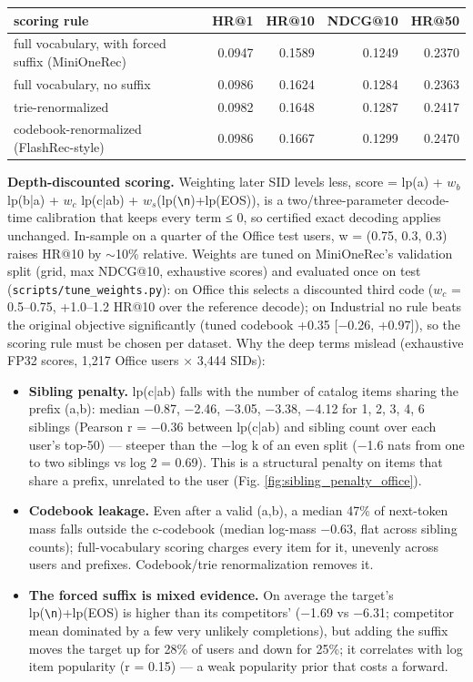 \documentclass[11pt]{article}
\newcommand{\nl}{\texttt{\textbackslash n}}
\newcommand{\code}[1]{\texttt{#1}}
\begin{document}
{\small
\setlength{\tabcolsep}{4pt}
\begin{longtable}{lrrrr}
\toprule
scoring rule & HR@1 & HR@10 & NDCG@10 & HR@50 \\
\midrule
\endhead
full vocabulary, with forced suffix (MiniOneRec) & 0.0947 & 0.1589 & 0.1249 & 0.2370 \\
full vocabulary, no suffix & 0.0986 & 0.1624 & 0.1284 & 0.2363 \\
trie-renormalized & 0.0982 & 0.1648 & 0.1287 & 0.2417 \\
codebook-renormalized (FlashRec-style) & 0.0986 & 0.1667 & 0.1299 & 0.2470 \\
\bottomrule
\end{longtable}
}

\textbf{Depth-discounted scoring.} Weighting later SID levels less, score = lp(a) + $w_{b}$ lp(b|a) + $w_{c}$ lp(c|ab) + $w_{s}$(lp(\nl{})+lp(EOS)), is a two/three-parameter decode-time calibration that keeps every term ≤ 0, so certified exact decoding applies unchanged. In-sample on a quarter of the Office test users, w = (0.75, 0.3, 0.3) raises HR@10 by \ensuremath{\sim}10\% relative. Weights are tuned on MiniOneRec's validation split (grid, max NDCG@10, exhaustive scores) and evaluated once on test (\code{scripts/\allowbreak{}tune\_\allowbreak{}weights.py}): on Office this selects a discounted third code ($w_{c}$ = 0.5–0.75, +1.0–1.2 HR@10 over the reference decode); on Industrial no rule beats the original objective significantly (tuned codebook +0.35 [−0.26, +0.97]), so the scoring rule must be chosen per dataset. Why the deep terms mislead (exhaustive FP32 scores, 1,217 Office users × 3,444 SIDs):

\begin{itemize}
\item \textbf{Sibling penalty.} lp(c|ab) falls with the number of catalog items sharing the prefix (a,b): median −0.87, −2.46, −3.05, −3.38, −4.12 for 1, 2, 3, 4, 6 siblings (Pearson r = −0.36 between lp(c|ab) and sibling count over each user's top-50) — steeper than the −log k of an even split (−1.6 nats from one to two siblings vs log 2 = 0.69). This is a structural penalty on items that share a prefix, unrelated to the user (Fig. \ref{fig:sibling_penalty_office}).
\item \textbf{Codebook leakage.} Even after a valid (a,b), a median 47\% of next-token mass falls outside the c-codebook (median log-mass −0.63, flat across sibling counts); full-vocabulary scoring charges every item for it, unevenly across users and prefixes. Codebook/trie renormalization removes it.
\item \textbf{The forced suffix is mixed evidence.} On average the target's lp(\nl{})+lp(EOS) is higher than its competitors' (−1.69 vs −6.31; competitor mean dominated by a few very unlikely completions), but adding the suffix moves the target up for 28\% of users and down for 25\%; it correlates with log item popularity (r = 0.15) — a weak popularity prior that costs a forward.
\end{itemize}
\end{document}
